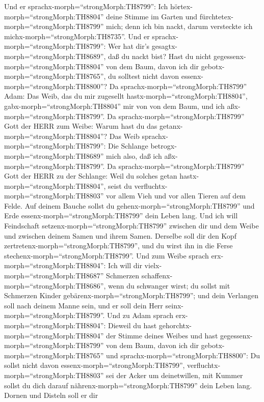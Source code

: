  Und er sprachx-morph=``strongMorph:TH8799'': Ich
hörtex-morph=``strongMorph:TH8804'' deine Stimme im Garten und
fürchtetex-morph=``strongMorph:TH8799'' mich; denn ich bin nackt, darum
versteckte ich michx-morph=``strongMorph:TH8735''.  Und er
sprachx-morph=``strongMorph:TH8799'': Wer hat dir's
gesagtx-morph=``strongMorph:TH8689'', daß du nackt bist? Hast du nicht
gegessenx-morph=``strongMorph:TH8804'' von dem Baum, davon ich dir
gebotx-morph=``strongMorph:TH8765'', du solltest nicht davon
essenx-morph=``strongMorph:TH8800''?  Da
sprachx-morph=``strongMorph:TH8799'' Adam: Das Weib, das du mir
zugesellt hastx-morph=``strongMorph:TH8804'',
gabx-morph=``strongMorph:TH8804'' mir von von dem Baum, und ich
aßx-morph=``strongMorph:TH8799''.  Da
sprachx-morph=``strongMorph:TH8799'' Gott der HERR zum Weibe: Warum hast
du das getanx-morph=``strongMorph:TH8804''? Das Weib
sprachx-morph=``strongMorph:TH8799'': Die Schlange
betrogx-morph=``strongMorph:TH8689'' mich also, daß ich
aßx-morph=``strongMorph:TH8799''.  Da
sprachx-morph=``strongMorph:TH8799'' Gott der HERR zu der Schlange: Weil
du solches getan hastx-morph=``strongMorph:TH8804'', seist du
verfluchtx-morph=``strongMorph:TH8803'' vor allem Vieh und vor allen
Tieren auf dem Felde. Auf deinem Bauche sollst du
gehenx-morph=``strongMorph:TH8799'' und Erde
essenx-morph=``strongMorph:TH8799'' dein Leben lang.  Und
ich will Feindschaft setzenx-morph=``strongMorph:TH8799'' zwischen dir
und dem Weibe und zwischen deinem Samen und ihrem Samen. Derselbe soll
dir den Kopf zertretenx-morph=``strongMorph:TH8799'', und du wirst ihn
in die Ferse stechenx-morph=``strongMorph:TH8799''.  Und
zum Weibe sprach erx-morph=``strongMorph:TH8804'': Ich will dir
vielx-morph=``strongMorph:TH8687'' Schmerzen
schaffenx-morph=``strongMorph:TH8686'', wenn du schwanger wirst; du
sollst mit Schmerzen Kinder gebärenx-morph=``strongMorph:TH8799''; und
dein Verlangen soll nach deinem Manne sein, und er soll dein Herr
seinx-morph=``strongMorph:TH8799''.  Und zu Adam sprach
erx-morph=``strongMorph:TH8804'': Dieweil du hast
gehorchtx-morph=``strongMorph:TH8804'' der Stimme deines Weibes und hast
gegessenx-morph=``strongMorph:TH8799'' von dem Baum, davon ich dir
gebotx-morph=``strongMorph:TH8765'' und
sprachx-morph=``strongMorph:TH8800'': Du sollst nicht davon
essenx-morph=``strongMorph:TH8799'',
verfluchtx-morph=``strongMorph:TH8803'' sei der Acker um deinetwillen,
mit Kummer sollst du dich darauf nährenx-morph=``strongMorph:TH8799''
dein Leben lang.  Dornen und Disteln soll er dir

